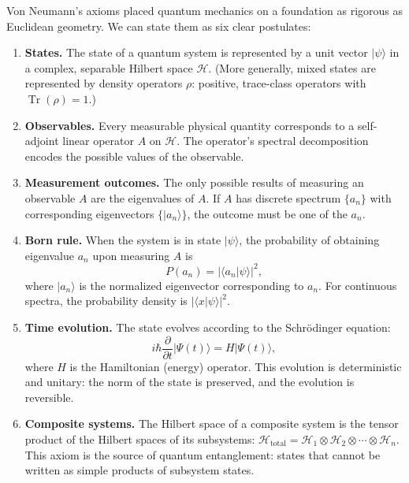 Von Neumann's axioms placed quantum mechanics on a foundation as rigorous as Euclidean geometry. We can state them as six clear postulates:

\begin{enumerate}
    \item \textbf{States.} The state of a quantum system is represented by a unit vector $|\psi\rangle$ in a complex, separable Hilbert space $\mathcal{H}$. (More generally, mixed states are represented by density operators $\rho$: positive, trace-class operators with $\operatorname{Tr}(\rho) = 1$.)

    \item \textbf{Observables.} Every measurable physical quantity corresponds to a self-adjoint linear operator $A$ on $\mathcal{H}$. The operator's spectral decomposition encodes the possible values of the observable.

    \item \textbf{Measurement outcomes.} The only possible results of measuring an observable $A$ are the eigenvalues of $A$. If $A$ has discrete spectrum $\{a_n\}$ with corresponding eigenvectors $\{|a_n\rangle\}$, the outcome must be one of the $a_n$.

    \item \textbf{Born rule.} When the system is in state $|\psi\rangle$, the probability of obtaining eigenvalue $a_n$ upon measuring $A$ is
    \[
        P(a_n) = |\langle a_n | \psi \rangle|^2,
    \]
    where $|a_n\rangle$ is the normalized eigenvector corresponding to $a_n$. For continuous spectra, the probability density is $|\langle x | \psi \rangle|^2$.

    \item \textbf{Time evolution.} The state evolves according to the Schr\"odinger equation:
    \[
        i\hbar \frac{\partial}{\partial t}|\Psi(t)\rangle = H|\Psi(t)\rangle,
    \]
    where $H$ is the Hamiltonian (energy) operator. This evolution is deterministic and unitary: the norm of the state is preserved, and the evolution is reversible.

    \item \textbf{Composite systems.} The Hilbert space of a composite system is the tensor product of the Hilbert spaces of its subsystems: $\mathcal{H}_{\text{total}} = \mathcal{H}_1 \otimes \mathcal{H}_2 \otimes \cdots \otimes \mathcal{H}_n$. This axiom is the source of quantum entanglement: states that cannot be written as simple products of subsystem states.
\end{enumerate}

